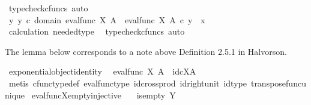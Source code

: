 \begin{isabellebody}
\ {\isacharparenleft}{\kern0pt}typecheck{\isacharunderscore}{\kern0pt}cfuncs{\isacharcomma}{\kern0pt}\ auto{\isacharparenright}{\kern0pt}\isanewline
\ \ \isamarkupfalse%
\ \isamarkupfalse%
\ {\isachardoublequoteopen}{\isasymexists}y{\isachardot}{\kern0pt}\ y\ {\isasymin}\isactrlsub c\ domain\ {\isacharparenleft}{\kern0pt}eval{\isacharunderscore}{\kern0pt}func\ X\ A{\isacharparenright}{\kern0pt}\ {\isasymand}\ eval{\isacharunderscore}{\kern0pt}func\ X\ A\ {\isasymcirc}\isactrlsub c\ y\ {\isacharequal}{\kern0pt}\ x{\isachardoublequoteclose}\isanewline
\ \ \ \ \isamarkupfalse%
\ calculation\ needed{\isacharunderscore}{\kern0pt}type\ \isamarkupfalse%
\ {\isacharparenleft}{\kern0pt}typecheck{\isacharunderscore}{\kern0pt}cfuncs{\isacharcomma}{\kern0pt}\ auto{\isacharparenright}{\kern0pt}\isanewline
{}\isamarkupfalse%
%
\endisatagproof
{\isafoldproof}%
%
\isadelimproof
%
\endisadelimproof
%
\begin{isamarkuptext}%
The lemma below corresponds to a note above Definition 2.5.1 in Halvorson.%
\end{isamarkuptext}\isamarkuptrue%
\isamarkupfalse%
\ exponential{\isacharunderscore}{\kern0pt}object{\isacharunderscore}{\kern0pt}identity{\isacharcolon}{\kern0pt}\isanewline
\ \ {\isachardoublequoteopen}{\isacharparenleft}{\kern0pt}eval{\isacharunderscore}{\kern0pt}func\ X\ A{\isacharparenright}{\kern0pt}\isactrlsup {\isasymsharp}\ {\isacharequal}{\kern0pt}\ id\isactrlsub c{\isacharparenleft}{\kern0pt}X\isactrlbsup A\isactrlesup {\isacharparenright}{\kern0pt}{\isachardoublequoteclose}\isanewline
%
\isadelimproof
\ \ %
\endisadelimproof
%
\isatagproof
{}\isamarkupfalse%
\ {\isacharparenleft}{\kern0pt}metis\ cfunc{\isacharunderscore}{\kern0pt}type{\isacharunderscore}{\kern0pt}def\ eval{\isacharunderscore}{\kern0pt}func{\isacharunderscore}{\kern0pt}type\ id{\isacharunderscore}{\kern0pt}cross{\isacharunderscore}{\kern0pt}prod\ id{\isacharunderscore}{\kern0pt}right{\isacharunderscore}{\kern0pt}unit\ id{\isacharunderscore}{\kern0pt}type\ transpose{\isacharunderscore}{\kern0pt}func{\isacharunderscore}{\kern0pt}unique{\isacharparenright}{\kern0pt}%
\endisatagproof
{\isafoldproof}%
%
\isadelimproof
\isanewline
%
\endisadelimproof
\isanewline
{}\isamarkupfalse%
\ eval{\isacharunderscore}{\kern0pt}func{\isacharunderscore}{\kern0pt}X{\isacharunderscore}{\kern0pt}empty{\isacharunderscore}{\kern0pt}injective{\isacharcolon}{\kern0pt}\isanewline
\ \ \ {\isachardoublequoteopen}is{\isacharunderscore}{\kern0pt}empty\ Y{\isachardoublequoteclose}\isanewline

\end{isabellebody}
